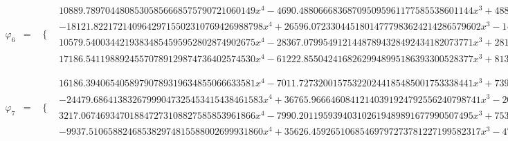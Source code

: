 \documentclass{article}
\begin{document}
\begin{landscape}
\begin{eqnarray*}
\begin{array}{cc}
\end{array}\\
\varphi_6 & = & \begin{array}{cc}
 \{ & 
\begin{array}{cc}
 10889.78970448085305856668575790721060149 x^4-4690.488066683687095095961177585538601144 x^3+488.3371981608473799486889267104202958025 x^2 & x\geq 0\land x<\frac{1}{4} \\
 -18121.82217214096429715502310769426988798 x^4+26596.07233044518014777983624214286579602 x^3-14314.45252785095127697135729257922008259 x^2+3348.390530833100305153417897545836895321 x-287.4491721446222368549979951078572357243 & x\geq \frac{1}{4}\land x<\frac{1}{2} \\
 10579.54003442193834854595952802874902675 x^4-28367.07995491214487894328492434182073771 x^3+28114.63698492638518227987940140815695594 x^2-12209.01587120769370690596923943953470028 x+1960.540548440924867345965130965881436988 & x\geq \frac{1}{2}\land x<\frac{3}{4} \\
 17186.54119889245570789129874736402574530 x^4-61222.85504241682629948995186393300528377 x^3+81329.30946075724029422714042347673535510 x^2-47736.21858983382452154962024461055784009 x+10443.22297260095481892113293770280202346 & x\geq \frac{3}{4}\land x<1
\end{array}

\end{array}\\
\varphi_7 & = & \begin{array}{cc}
 \{ & 
\begin{array}{cc}
 16186.39406540589790789319634855066633581 x^4-7011.727320015753220244185485001753338441 x^3+739.6033954511734358981356736792448558228 x^2 & x\geq 0\land x<\frac{1}{4} \\
 -24479.68641383267999047325453415438461583 x^4+36765.96664608412140391924792556240798741 x^3-20174.43396531511874548901271626412611067 x^2+4790.331091691830717310833610659970919125 x-415.6300292233492640780713265730304598123 & x\geq \frac{1}{4}\land x<\frac{1}{2} \\
 3217.067469347018847273108827585853961866 x^4-7990.201195939403102619489891677990507495 x^3+7532.068113889286784310922650367674516322 x^2-3197.422047584780851458230073911650125530 x+515.0948831680645238146711911011148065256 & x\geq \frac{1}{2}\land x<\frac{3}{4} \\
 -9937.510658824685382974815588002699931860 x^4+35626.45926510685469797273781227199582317 x^3-47650.50269309032547414218637467026430739 x^2+28171.67022615882838626542166453534087269 x-6210.116139350672227121157514134372456619 & x\geq \frac{3}{4}\land x<1
\end{array}


\end{array}
\end{eqnarray*}
\end{landscape}
\end{document}
